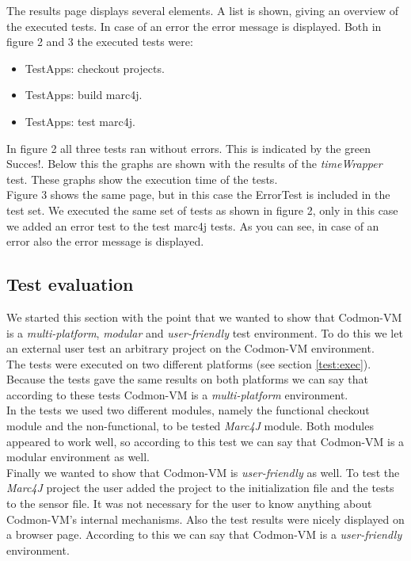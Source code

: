 \documentclass{article}
\newcommand{\project}{Codmon-VM}
\begin{document}
\newpage
\noindent The results page displays several elements. A list is shown, giving an overview of the executed tests. In case of an error the error message is displayed. Both in figure 2 and 3 the executed 
tests were:

\begin{itemize}
\item TestApps: checkout projects.
\item TestApps: build marc4j.
\item TestApps: test marc4j.
\end{itemize}

\noindent In figure 2 all three tests ran without errors. This is indicated by the green Succes!. Below this the graphs are shown with the results of the \emph{timeWrapper} test. These graphs show 
the execution time of the tests.\\

\noindent Figure 3 shows the same page, but in this case the ErrorTest is included in the test set. We executed the same set of tests as shown in figure 2, only in this case we added an error test to the 
test marc4j tests. As you can see, in case of an error also the error message is displayed.\\

\subsection{Test evaluation}
\label{test:evaluation}
We started this section with the point that we wanted to show that \project{} is a \emph{multi-platform}, \emph{modular} and \emph{user-friendly} test environment. To do this we let an external user test an 
arbitrary project on the \project{} environment.\\

\noindent The tests were executed on two different platforms (see section \ref{test:exec}). Because the tests gave the same results on both platforms we can say that according to these tests \project{} is 
a \emph{multi-platform} environment.\\

\noindent In the tests we used two different modules, namely the functional checkout module and the non-functional, to be tested \emph{Marc4J} module. Both modules appeared to work well, so according to 
this test we can say that \project{} is a modular environment as well.\\

\noindent Finally we wanted to show that \project{} is \emph{user-friendly} as well. To test the \emph{Marc4J} project the user added the project to the initialization file and the tests to the sensor file. 
It was not necessary for the user to know anything about \project{}'s internal mechanisms. Also the test results were nicely displayed on a browser page. According to this we can say that \project{} is a 
\emph{user-friendly} environment.\\
\end{document}
